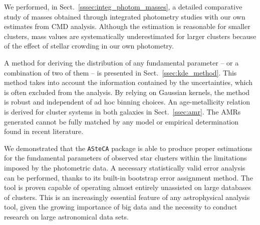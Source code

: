 \documentclass{aa}
\begin{document}
We performed, in Sect.~\ref{sssec:integ_photom_masses}, a detailed comparative
study of masses obtained through integrated photometry studies with our own
estimates from CMD analysis.
Although the estimation is reasonable for smaller clusters, mass values
are systematically underestimated for larger
clusters because of the effect of stellar crowding in our own photometry.

A method for deriving the distribution of any fundamental parameter -- or a
combination of two of them -- is presented in Sect.~\ref{ssec:kde_method}. This method
takes into account the information contained by the uncertainties, which is often
excluded from the analysis. By relying on Gaussian kernels, the method is robust and
independent of ad hoc binning choices.
%
An age-metallicity relation is derived for
cluster systems in both galaxies in Sect.~\ref{ssec:amr}. The AMRs generated
cannot be fully matched by any model or empirical determination found in recent
literature.

We demonstrated that the \texttt{ASteCA} package is able to produce proper
estimations for the fundamental parameters of observed star clusters
within the limitations imposed by the photometric data.
A necessary statistically valid error analysis
can be performed, thanks to its built-in bootstrap error assignment method.
%
The tool is proven capable of operating almost entirely unassisted on large
databases of clusters. This is an increasingly essential feature
of any astrophysical analysis tool, given the growing importance of big data and
the necessity to conduct research on large astronomical data sets.




\end{document}
